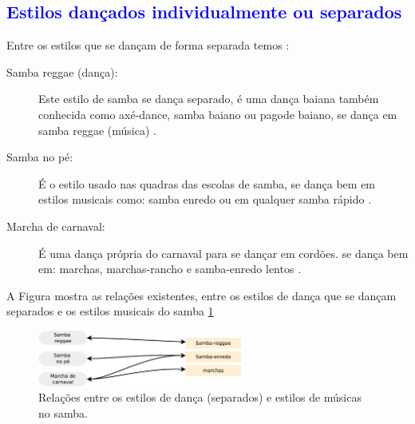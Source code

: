 \subsection{\textcolor{blue}{Estilos dançados individualmente ou separados }}
Entre os estilos que se dançam de forma separada temos \cite[pp. 134]{perna2002samba}:
\begin{description}
\item[Samba reggae  (dança):] Este estilo de samba se dança separado, 
é uma dança baiana também conhecida como axé-dance, samba baiano ou pagode baiano,
se dança em samba reggae (música) \cite[pp. 134]{perna2002samba}.

\item[Samba no pé:] É o estilo usado nas quadras das escolas de samba,
se dança bem em estilos musicais como: 
samba enredo ou em qualquer samba rápido  \cite[pp. 134]{perna2002samba}.

\item[Marcha de carnaval:] É uma dança própria do carnaval para se dançar em cordões.
se dança bem em: marchas, marchas-rancho e samba-enredo lentos  \cite[pp. 135]{perna2002samba}.

\end{description}

A Figura mostra as relações existentes, 
entre os estilos de dança que se dançam separados e os estilos musicais do samba \ref{fig:sambadavavsmusicaseparado} \cite[pp. 134-138]{perna2002samba}

\begin{figure}[h]
  \centering
    \includegraphics[width=0.6\textwidth]{chapters/cap-historia-musicasamba/dancavcmusicaseparado.eps}
  \caption{Relações entre os estilos de dança (separados) e estilos de músicas no samba.}
\label{fig:sambadavavsmusicaseparado}
\end{figure}
